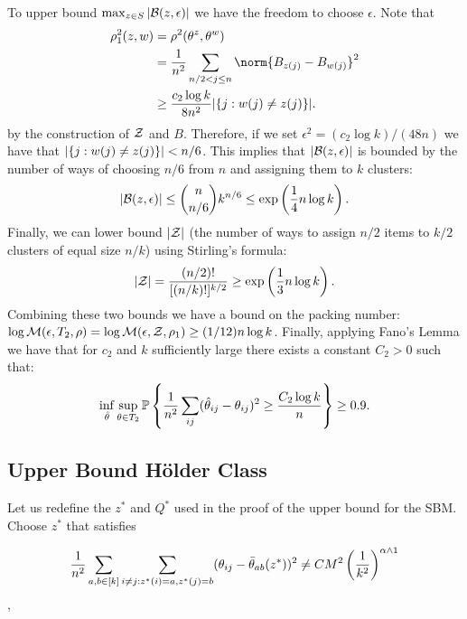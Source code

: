 \documentclass[11pt]{article}
\begin{document}
To upper bound $\max_{z \in S} |\mathcal{B}(z, \epsilon)|$ we have the freedom to choose $\epsilon$. Note that
\begin{equation}
\begin{aligned}
\rho_1^2(z, w) &= \rho^2(\theta^z, \theta^w) \\
               &= \frac{1}{n^2} \sum_{n/2 < j \leq n}\norm{B_{z(j)} - B_{w(j)}}^2 \\
               &\geq \frac{c_2 \log k}{8 n^2} |\set{j : w(j) \neq z(j)}|.
\end{aligned}
\end{equation}
by the construction of $\mathcal{Z}$ and $B$. Therefore, if we set $\epsilon^2 = (c_2 \log k)/(48 n)$ we have that $|\{j : w(j) \neq z(j)\}| < n/6$. This implies that $|\mathcal{B}(z, \epsilon)|$ is bounded by the number of ways of choosing $n/6$ from $n$ and assigning them to $k$ clusters:
\begin{equation}
|\mathcal{B}(z, \epsilon)| \leq {n \choose n/6} k^{n/6} \leq \exp\left(\frac{1}{4} n \log k\right).
\end{equation}
Finally, we can lower bound $|\mathcal{Z}|$ (the number of ways to assign $n/2$ items to $k/2$ clusters of equal size $n/k$) using Stirling's formula:
\begin{equation}
|\mathcal{Z}| = \frac{(n/2)!}{[(n/k)!]^{k/2}} \geq \exp\left(\frac{1}{3} n \log k\right).
\end{equation}
Combining these two bounds we have a bound on the packing number: $\log \mathcal{M}(\epsilon, T_2, \rho) = \log \mathcal{M}(\epsilon, \mathcal{Z}, \rho_1) \geq (1/12) n \log k$. Finally, applying Fano's Lemma we have that for $c_2$ and $k$ sufficiently large there exists a constant $C_2 > 0$ such that:
\begin{equation}\label{eq:sbmclust}
\inf_{\hat{\theta}} \sup_{\theta \in T_2} \mathbb{P} \left\{ \frac{1}{n^2} \sum_{ij} (\hat{\theta}_{ij} - \theta_{ij})^2 \geq \frac{C_2 \log k}{n} \right\} \geq 0.9.
\end{equation}

\subsection{Upper Bound H\"older Class} \label{sec:upper_hold}

Let us redefine the $z^\ast$ and $Q^\ast$ used in the proof of the upper bound for the SBM. Choose $z^\ast$ that satisfies

\[ \frac{1}{n^2} \sum_{a,b\in \lbrack k\rbrack} \sum_{i\neq j: z^\ast(i)=a, z^\ast(j)=b} (\theta_{ij} -\bar{\theta}_{ab}(z^\ast)  )^2 \neq CM^2 \left( \frac{1}{k^2} \right)^{\alpha \wedge 1}  \],
\end{document}
